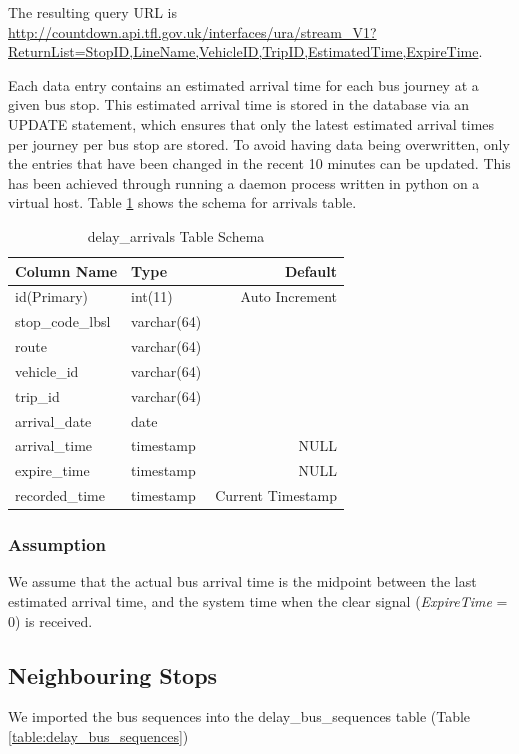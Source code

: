 \par The resulting query URL is \sloppy \url{http://countdown.api.tfl.gov.uk/interfaces/ura/stream_V1?ReturnList=StopID,LineName,VehicleID,TripID,EstimatedTime,ExpireTime}.

\par Each data entry contains an estimated arrival time for each bus journey at a given bus stop. This estimated arrival time is stored in the database via an UPDATE statement, which ensures that only the latest estimated arrival times per journey per bus stop are stored. To avoid having data being overwritten, only the entries that have been changed in the recent 10 minutes can be updated. This has been achieved through running a daemon process written in python on a virtual host. Table \ref{table:delay_arrivals_schema} shows the schema for arrivals table.

\begin{table}
\centering
\begin{tabular}{@{}llr@{}} \toprule
Column Name & Type & Default \\ \midrule
id(Primary) & int(11) & Auto Increment \\
stop\_code\_lbsl & varchar(64) &  \\
route & varchar(64) &  \\
vehicle\_id & varchar(64) & \\
trip\_id & varchar(64) & \\
arrival\_date & date &  \\
arrival\_time & timestamp & NULL \\
expire\_time & timestamp & NULL \\
recorded\_time & timestamp & Current Timestamp \\ \bottomrule
\end{tabular}
\caption{delay\_arrivals Table Schema}
\label{table:delay_arrivals_schema}
\end{table}

\subsubsection{Assumption}
We assume that the actual bus arrival time is the midpoint between the last estimated arrival time, and the system time when the clear signal (\textit{ExpireTime} = 0) is received.

\subsection{Neighbouring Stops}
\label{sec:bus_stop_locations_routes}
We imported the bus sequences into the delay\_bus\_sequences table (Table \ref{table:delay_bus_sequences})

